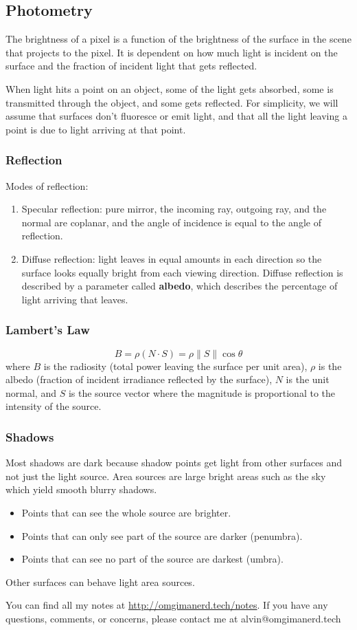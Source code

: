\documentclass{math}
\begin{document}
\subsection*{Photometry}
The brightness of a pixel is a function of the brightness of the surface in the
scene that projects to the pixel. It is dependent on how much light is incident
on the surface and the fraction of incident light that gets reflected. \par
When light hits a point on an object, some of the light gets absorbed, some is
transmitted through the object, and some gets reflected. For simplicity, we will
assume that surfaces don't fluoresce or emit light, and that all the light
leaving a point is due to light arriving at that point.

\subsubsection*{Reflection}
Modes of reflection:
\begin{enumerate}
  \item Specular reflection: pure mirror, the incoming ray, outgoing ray, and
    the normal are coplanar, and the angle of incidence is equal to the angle
    of reflection.
  \item Diffuse reflection: light leaves in equal amounts in each direction so
    the surface looks equally bright from each viewing direction. Diffuse
    reflection is described by a parameter called \textbf{albedo}, which
    describes the percentage of light arriving that leaves.
\end{enumerate}

\subsubsection*{Lambert's Law}
\[ B = \rho(N\cdot S) = \rho\|S\|\cos\theta \]
where \( B \) is the radiosity (total power leaving the surface per unit area),
\( \rho \) is the albedo (fraction of incident irradiance reflected by the
surface), \( N \) is the unit normal, and \( S \) is the source vector where
the magnitude is proportional to the intensity of the source.

\subsubsection*{Shadows}
Most shadows are dark because shadow points get light from other surfaces and
not just the light source. Area sources are large bright areas such as the sky
which yield smooth blurry shadows.
\begin{itemize}
  \item Points that can see the whole source are brighter.
  \item Points that can only see part of the source are darker (penumbra).
  \item Points that can see no part of the source are darkest (umbra).
\end{itemize}
Other surfaces can behave light area sources.

\begin{center}
  You can find all my notes at \url{http://omgimanerd.tech/notes}. If you have
  any questions, comments, or concerns, please contact me at
  alvin@omgimanerd.tech
\end{center}
\end{document}
